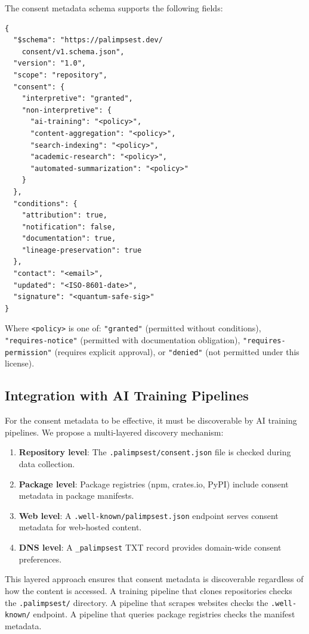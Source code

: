 \documentclass[11pt,twocolumn]{article}
\begin{document}
The consent metadata schema supports the following fields:

\begin{lstlisting}
{
  "$schema": "https://palimpsest.dev/
    consent/v1.schema.json",
  "version": "1.0",
  "scope": "repository",
  "consent": {
    "interpretive": "granted",
    "non-interpretive": {
      "ai-training": "<policy>",
      "content-aggregation": "<policy>",
      "search-indexing": "<policy>",
      "academic-research": "<policy>",
      "automated-summarization": "<policy>"
    }
  },
  "conditions": {
    "attribution": true,
    "notification": false,
    "documentation": true,
    "lineage-preservation": true
  },
  "contact": "<email>",
  "updated": "<ISO-8601-date>",
  "signature": "<quantum-safe-sig>"
}
\end{lstlisting}

Where \texttt{<policy>} is one of: \texttt{"granted"} (permitted without
conditions), \texttt{"requires-notice"} (permitted with documentation
obligation), \texttt{"requires-permission"} (requires explicit
approval), or \texttt{"denied"} (not permitted under this license).

\subsection{Integration with AI Training Pipelines}

For the consent metadata to be effective, it must be discoverable by
AI training pipelines. We propose a multi-layered discovery mechanism:

\begin{enumerate}
    \item \textbf{Repository level}: The \texttt{.palimpsest/consent.json}
          file is checked during data collection.
    \item \textbf{Package level}: Package registries (npm, crates.io,
          PyPI) include consent metadata in package manifests.
    \item \textbf{Web level}: A \texttt{.well-known/palimpsest.json}
          endpoint serves consent metadata for web-hosted content.
    \item \textbf{DNS level}: A \texttt{\_palimpsest} TXT record
          provides domain-wide consent preferences.
\end{enumerate}

This layered approach ensures that consent metadata is discoverable
regardless of how the content is accessed. A training pipeline that
clones repositories checks the \texttt{.palimpsest/} directory. A
pipeline that scrapes websites checks the \texttt{.well-known/} endpoint.
A pipeline that queries package registries checks the manifest metadata.
\end{document}
